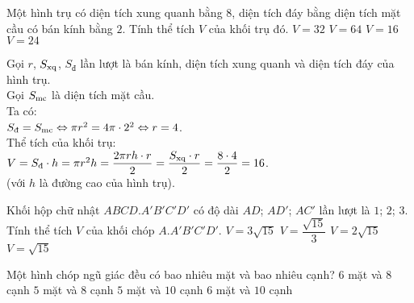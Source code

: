 \begin{ex}%
 Một hình trụ có diện tích xung quanh bằng $8$, diện tích đáy bằng diện tích mặt cầu có bán kính bằng $2$. Tính thể tích $V$ của khối trụ đó.
 \choice
  {$V = 32$}
  {$V = 64$}
  {\True $V = 16$}
  {$V = 24$}
 \loigiai
  {
  \immini
  {
  Gọi $r$, $S_{\rm{xq}}$, $S_{\textrm{đ}}$ lần lượt là bán kính, diện tích xung quanh và diện tích đáy của hình trụ.\\
  Gọi $S_{\rm{mc}}$ là diện tích mặt cầu.\\
  Ta có:\\
  $S_{\textrm{đ}} = S_{\rm{mc}} \Leftrightarrow \pi r^2 = 4\pi \cdot 2^2 \Leftrightarrow r = 4$.\\
  Thể tích của khối trụ:\\
  $V = S_{\textrm{đ}} \cdot h = \pi r^2 h = \dfrac{2 \pi r h \cdot r}{2} = \dfrac{S_{\rm{xq}} \cdot r}{2} = \dfrac{8 \cdot 4}{2} = 16$.\\
  (với $h$ là đường cao của hình trụ).
  }
  {
  }
  }
\end{ex}


\begin{ex}%
 Khối hộp chữ nhật $ABCD.A'B'C'D'$ có độ dài $AD$; $AD'$; $AC'$ lần lượt là $1$; $2$; $3$. Tính thể tích $V$ của khối chóp $A.A'B'C'D'$.
 \choice
  {$V = 3\sqrt{15}$}
  {\True $V = \dfrac{\sqrt{15}}{3}$}
  {$V = 2\sqrt{15}$}
  {$V = \sqrt{15}$}
\end{ex}


\begin{ex}%
 Một hình chóp ngũ giác đều có bao nhiêu mặt và bao nhiêu cạnh?
 \choice
  {$6$ mặt và $8$ cạnh}
  {$5$ mặt và $8$ cạnh}
  {$5$ mặt và $10$ cạnh}
  {\True $6$ mặt và $10$ cạnh}
\end{ex}


